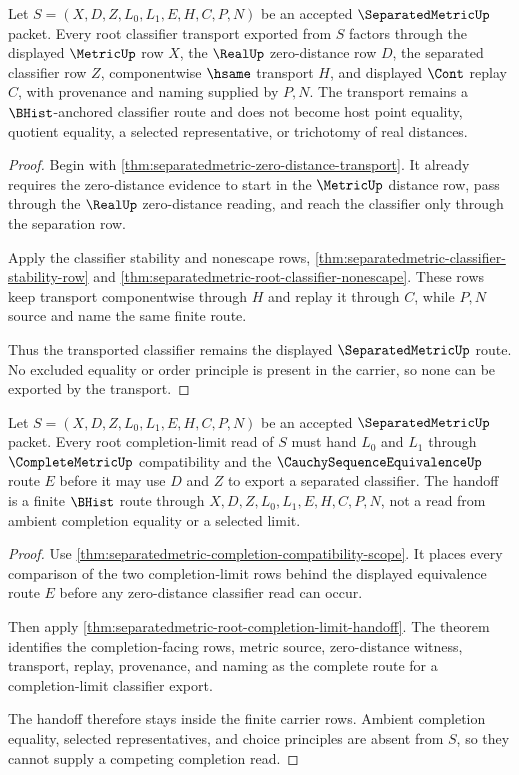 \begin{theorem}
\label{thm:separatedmetric-root-classifier-transport}
Let $S=(X,D,Z,L_0,L_1,E,H,C,P,N)$ be an accepted $\SeparatedMetricUp$ packet. Every root classifier transport exported from $S$ factors through the displayed $\MetricUp$ row $X$, the $\RealUp$ zero-distance row $D$, the separated classifier row $Z$, componentwise $\hsame$ transport $H$, and displayed $\Cont$ replay $C$, with provenance and naming supplied by $P,N$. The transport remains a $\BHist$-anchored classifier route and does not become host point equality, quotient equality, a selected representative, or trichotomy of real distances.
\end{theorem}
\begin{proof}
Begin with \autoref{thm:separatedmetric-zero-distance-transport}. It already requires the zero-distance evidence to start in the $\MetricUp$ distance row, pass through the $\RealUp$ zero-distance reading, and reach the classifier only through the separation row.

Apply the classifier stability and nonescape rows, \autoref{thm:separatedmetric-classifier-stability-row} and \autoref{thm:separatedmetric-root-classifier-nonescape}. These rows keep transport componentwise through $H$ and replay it through $C$, while $P,N$ source and name the same finite route.

Thus the transported classifier remains the displayed $\SeparatedMetricUp$ route. No excluded equality or order principle is present in the carrier, so none can be exported by the transport.
\end{proof}

\begin{theorem}
\label{thm:separatedmetric-root-completion-handoff}
Let $S=(X,D,Z,L_0,L_1,E,H,C,P,N)$ be an accepted $\SeparatedMetricUp$ packet. Every root completion-limit read of $S$ must hand $L_0$ and $L_1$ through $\CompleteMetricUp$ compatibility and the $\CauchySequenceEquivalenceUp$ route $E$ before it may use $D$ and $Z$ to export a separated classifier. The handoff is a finite $\BHist$ route through $X,D,Z,L_0,L_1,E,H,C,P,N$, not a read from ambient completion equality or a selected limit.
\end{theorem}
\begin{proof}
Use \autoref{thm:separatedmetric-completion-compatibility-scope}. It places every comparison of the two completion-limit rows behind the displayed equivalence route $E$ before any zero-distance classifier read can occur.

Then apply \autoref{thm:separatedmetric-root-completion-limit-handoff}. The theorem identifies the completion-facing rows, metric source, zero-distance witness, transport, replay, provenance, and naming as the complete route for a completion-limit classifier export.

The handoff therefore stays inside the finite carrier rows. Ambient completion equality, selected representatives, and choice principles are absent from $S$, so they cannot supply a competing completion read.
\end{proof}


